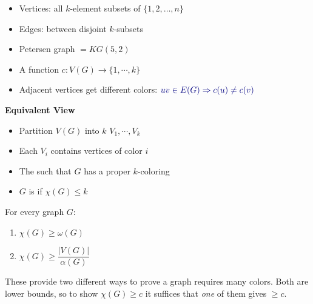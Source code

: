 \documentclass[8pt,a4paper,landscape]{extarticle}
\begin{document}
\begin{cscolumns}
\begin{definition}
\begin{itemize}
\item Vertices: all $k$-element subsets of $\{1,2,\dots,n\}$
\item Edges: between disjoint $k$-subsets
\item Petersen graph $=KG(5,2)$
\end{itemize}
\end{definition}

\begin{definition}
\begin{itemize}
\item A function $c:V(G)\to\{1,\cdots,k\}$
\item Adjacent vertices get different colors: ${\color{csBlue}uv\in E(G)\Rightarrow c(u)\ne c(v)}$
\end{itemize}
\textbf{Equivalent View}
\begin{itemize}
\item Partition $V(G)$ into $k$  $V_1,\cdots,V_k$
\item Each $V_i$ contains vertices of color $i$
\end{itemize}
\end{definition}
\begin{definition}
\begin{itemize}
\item The  such that $G$ has a proper $k$-coloring
\item $G$ is  if $\chi(G)\le k$
\end{itemize}
\end{definition}

\begin{theorem}
For every graph $G$:
\begin{enumerate}[label=\arabic*.]
\item $\chi(G)\ge\omega(G)$
\item $\chi(G)\ge\dfrac{|V(G)|}{\alpha(G)}$
\end{enumerate}
\end{theorem}
These provide two different ways to prove a graph requires many colors. Both are lower bounds, so to show $\chi(G)\ge c$ it suffices that \emph{one} of them gives $\ge c$.


\end{cscolumns}
\end{document}
